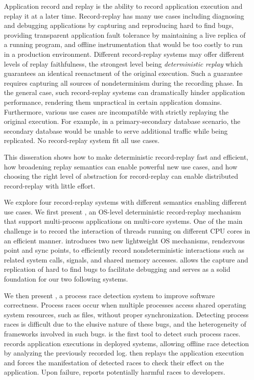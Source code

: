 Application record and replay is the ability to record application execution and
replay it at a later time. Record-replay has many use cases including diagnosing and
debugging applications by capturing and reproducing hard to find bugs, providing
transparent application fault tolerance by maintaining a live replica of a running program,
and offline instrumentation that would be too costly to run in a production environment.
Different record-replay systems may offer different levels of replay faithfulness,
the strongest level being {\em deterministic replay} which guarantees an identical
reenactment of the original execution.
Such a guarantee requires capturing all sources of nondeterminism during the recording
phase. In the general case, such record-replay systems can dramatically hinder
application performance, rendering them unpractical in certain application domains.
Furthermore, various use cases are incompatible with strictly replaying the original execution.
For example, in a primary-secondary database scenario, the secondary database
would be unable to serve additional traffic while being replicated.
No record-replay system fit all use cases.

This disseration shows how to make deterministic record-replay fast and
efficient, how broadening replay semantics can enable powerful new use cases,
and how choosing the right level of abstraction for record-replay can enable distributed
record-replay with little effort.

We explore four record-replay systems with different semantics enabling different use cases.
We first present \scribe, an OS-level deterministic record-replay mechanism
that support multi-process applications on multi-core systems.
One of the main
challenge is to record the interaction of threads running on different CPU cores
in an efficient manner.
\scribe introduces two new lightweight OS mechanisms, rendezvous point and sync
points, to efficiently record nondeterministic interactions such as related
system calls, signals, and shared memory accesses. \scribe allows the capture
and replication of hard to find bugs to facilitate debugging and serves as a
solid foundation for our two following systems.

We then present \racepro, a process race detection system to improve
software correctness. Process races occur when multiple processes access shared
operating system resources, such as files, without proper synchronization.
Detecting process races is difficult due to the elusive nature of these bugs,
and the heterogeneity of frameworks involved in such bugs.
\racepro is the first tool to detect such process races.
\racepro records application executions in deployed systems, allowing offline
race detection by analyzing the previously recorded log. \racepro then replays
the application execution and forces the manifestation of detected races to check their
effect on the application. Upon failure, \racepro reports potentially harmful
races to developers.

